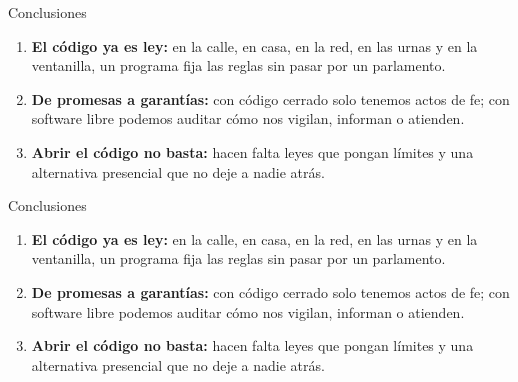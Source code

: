 \documentclass[aspectratio=169,12pt]{beamer}
\begin{document}
\begin{frame}{Conclusiones}
  \vspace{0.3cm}
  \begin{enumerate}
    \item \textbf{El código ya es ley:} en la calle, en casa, en la red, en las urnas y en la ventanilla, un programa fija las reglas sin pasar por un parlamento.\vspace{0.3cm}
    \item \textbf{De promesas a garantías:} con código cerrado solo tenemos actos de fe; con software libre podemos auditar cómo nos vigilan, informan o atienden.\vspace{0.3cm}
    \item[\color{white}3.] {\color{white}\textbf{Abrir el código no basta:} hacen falta leyes que pongan límites y una alternativa presencial que no deje a nadie atrás.}
  \end{enumerate}
\end{frame}

\begin{frame}{Conclusiones}
  \vspace{0.3cm}
  \begin{enumerate}
    \item \textbf{El código ya es ley:} en la calle, en casa, en la red, en las urnas y en la ventanilla, un programa fija las reglas sin pasar por un parlamento.\vspace{0.3cm}
    \item \textbf{De promesas a garantías:} con código cerrado solo tenemos actos de fe; con software libre podemos auditar cómo nos vigilan, informan o atienden.\vspace{0.3cm}
    \item \textbf{Abrir el código no basta:} hacen falta leyes que pongan límites y una alternativa presencial que no deje a nadie atrás.
  \end{enumerate}
\end{frame}
\end{document}
